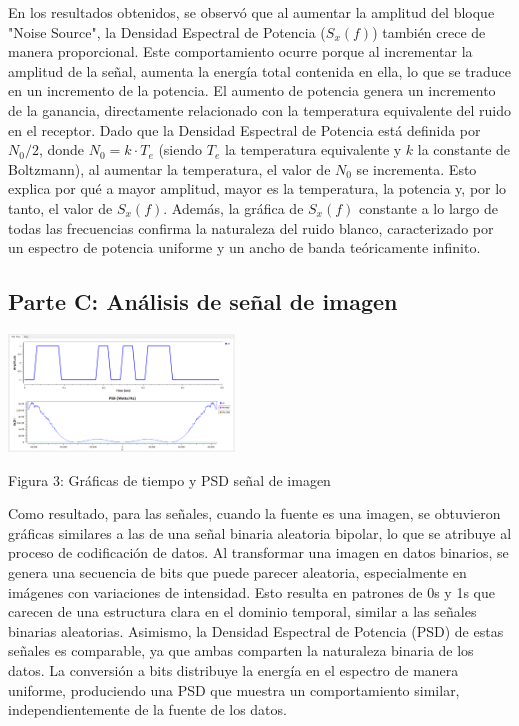 \documentclass{journal}[IEEEtran, twocolumn]             %
\begin{document}
\begin{multicols}{2}
En los resultados obtenidos, se observó que al aumentar la amplitud del bloque "Noise Source", la Densidad Espectral de Potencia ($S_x(f)$) también crece de manera proporcional. Este comportamiento ocurre porque al incrementar la amplitud de la señal, aumenta la energía total contenida en ella, lo que se traduce en un incremento de la potencia. El aumento de potencia genera un incremento de la ganancia, directamente relacionado con la temperatura equivalente del ruido en el receptor. Dado que la Densidad Espectral de Potencia está definida por $N_0/2$, donde $N_0 = k \cdot T_e$ (siendo $T_e$ la temperatura equivalente y $k$ la constante de Boltzmann), al aumentar la temperatura, el valor de $N_0$ se incrementa. Esto explica por qué a mayor amplitud, mayor es la temperatura, la potencia y, por lo tanto, el valor de $S_x(f)$. Además, la gráfica de $S_x(f)$ constante a lo largo de todas las frecuencias confirma la naturaleza del ruido blanco, caracterizado por un espectro de potencia uniforme y un ancho de banda teóricamente infinito.


\subsection{Parte C: Análisis de señal de imagen}

    \begin{center}
    \includegraphics[width=0.45\textwidth]{figs/F4.png}
    \caption{Figura 3: Gráficas de tiempo y PSD señal de imagen}
    \end{center}


Como resultado, para las señales, cuando la fuente es una imagen, se obtuvieron gráficas similares a las de una señal binaria aleatoria bipolar, lo que se atribuye al proceso de codificación de datos. Al transformar una imagen en datos binarios, se genera una secuencia de bits que puede parecer aleatoria, especialmente en imágenes con variaciones de intensidad. Esto resulta en patrones de 0s y 1s que carecen de una estructura clara en el dominio temporal, similar a las señales binarias aleatorias. Asimismo, la Densidad Espectral de Potencia (PSD) de estas señales es comparable, ya que ambas comparten la naturaleza binaria de los datos. La conversión a bits distribuye la energía en el espectro de manera uniforme, produciendo una PSD que muestra un comportamiento similar, independientemente de la fuente de los datos.



\end{multicols}
\end{document}
